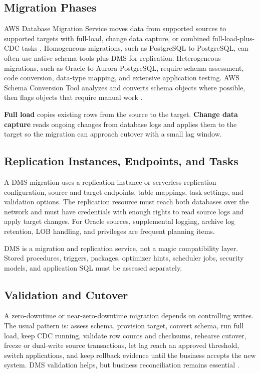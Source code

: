 \subsection{Migration Phases}
AWS Database Migration Service moves data from supported sources to supported targets with full-load, change data capture, or combined full-load-plus-CDC tasks \cite{awsDMSUserGuide}. Homogeneous migrations, such as PostgreSQL to PostgreSQL, can often use native schema tools plus DMS for replication. Heterogeneous migrations, such as Oracle to Aurora PostgreSQL, require schema assessment, code conversion, data-type mapping, and extensive application testing. AWS Schema Conversion Tool analyzes and converts schema objects where possible, then flags objects that require manual work \cite{awsSCTUserGuide}.

\begin{definitionbox}
\textbf{Full load} copies existing rows from the source to the target. \textbf{Change data capture} reads ongoing changes from database logs and applies them to the target so the migration can approach cutover with a small lag window.
\end{definitionbox}

\subsection{Replication Instances, Endpoints, and Tasks}
A DMS migration uses a replication instance or serverless replication configuration, source and target endpoints, table mappings, task settings, and validation options. The replication resource must reach both databases over the network and must have credentials with enough rights to read source logs and apply target changes. For Oracle sources, supplemental logging, archive log retention, LOB handling, and privileges are frequent planning items.

\begin{notebox}
DMS is a migration and replication service, not a magic compatibility layer. Stored procedures, triggers, packages, optimizer hints, scheduler jobs, security models, and application SQL must be assessed separately.
\end{notebox}

\subsection{Validation and Cutover}
A zero-downtime or near-zero-downtime migration depends on controlling writes. The usual pattern is: assess schema, provision target, convert schema, run full load, keep CDC running, validate row counts and checksums, rehearse cutover, freeze or dual-write source transactions, let lag reach an approved threshold, switch applications, and keep rollback evidence until the business accepts the new system. DMS validation helps, but business reconciliation remains essential \cite{awsDMSBestPractices}.


